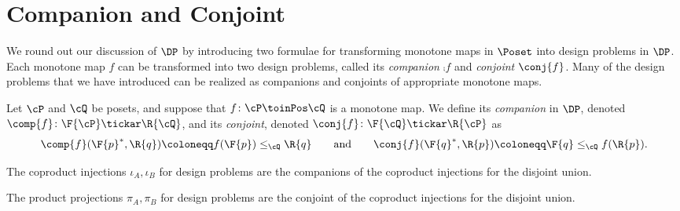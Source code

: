 \section{Companion and Conjoint}
We round out our discussion of $\DP$ by introducing two formulae for transforming monotone maps in $\Poset$ into design problems in $\DP$. Each monotone map $f$ can be transformed into two design problems, called its \emph{companion} $\comp{f}$ and \emph{conjoint} $\conj{f}$. Many of the design problems that we have introduced can be realized as companions and conjoints of appropriate monotone maps.

\begin{definition}
\label{def:comp_conj}
Let $\cP $ and $\cQ $ be posets, and suppose that $f\colon\cP \toinPos \cQ $ is a monotone map. We define its \emph{companion} in $\DP$, denoted $\comp{f}\colon \F{\cP} \tickar \R{\cQ}$,
and its \emph{conjoint}, denoted $\conj{f}\colon \F{\cQ} \tickar \R{\cP}$ as
\begin{equation}
\comp{f}(\F{p}^*,\R{q})\coloneqq f(\F{p}) \leq_\cQ \R{q}
\qquad\text{and}\qquad
\conj{f}(\F{q}^*,\R{p})\coloneqq \F{q} \leq_\cQ f(\R{p}).
\end{equation}
\end{definition}


\begin{example}The coproduct injections $\iota_A, \iota_B$ for design problems are the companions of the coproduct injections for the disjoint union.
\end{example}

\begin{example}The product projections $\pi_A, \pi_B$ for design problems are the conjoint of the coproduct injections for the disjoint union.\end{example}

